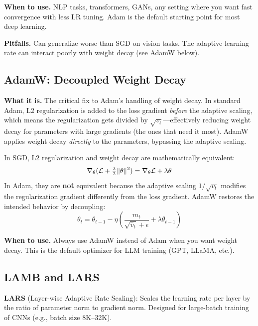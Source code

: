 \textbf{When to use.} NLP tasks, transformers, GANs, any setting where you want fast convergence with less LR tuning. Adam is the default starting point for most deep learning.

\textbf{Pitfalls.} Can generalize worse than SGD on vision tasks. The adaptive learning rate can interact poorly with weight decay (see AdamW below).

\subsection{AdamW: Decoupled Weight Decay}

\textbf{What it is.} The critical fix to Adam's handling of weight decay. In standard Adam, L2 regularization is added to the loss gradient \textit{before} the adaptive scaling, which means the regularization gets divided by $\sqrt{v_t}$---effectively reducing weight decay for parameters with large gradients (the ones that need it most). AdamW applies weight decay \textit{directly} to the parameters, bypassing the adaptive scaling.

\begin{keyinsight}
In SGD, L2 regularization and weight decay are mathematically equivalent:
\begin{equation}
\nabla_\theta(\mathcal{L} + \tfrac{\lambda}{2}\|\theta\|^2) = \nabla_\theta \mathcal{L} + \lambda\theta
\end{equation}
In Adam, they are \textbf{not} equivalent because the adaptive scaling $1/\sqrt{v_t}$ modifies the regularization gradient differently from the loss gradient. AdamW restores the intended behavior by decoupling:
\begin{equation}
\theta_t = \theta_{t-1} - \eta\left(\frac{\hat{m}_t}{\sqrt{\hat{v}_t} + \epsilon} + \lambda \theta_{t-1}\right)
\end{equation}
\end{keyinsight}

\textbf{When to use.} Always use AdamW instead of Adam when you want weight decay. This is the default optimizer for LLM training (GPT, LLaMA, etc.).

\subsection{LAMB and LARS}

\textbf{LARS} (Layer-wise Adaptive Rate Scaling): Scales the learning rate per layer by the ratio of parameter norm to gradient norm. Designed for large-batch training of CNNs (e.g., batch size 8K--32K).

